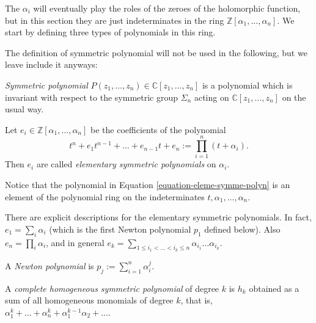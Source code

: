 \medskip\noindent
The $\alpha_i$ will eventually play the roles
of the zeroes
of the holomorphic function, but in this
section they are just
indeterminates in the ring
$\mathbb{Z}[\alpha_1,\ldots,\alpha_n]$.
We start by defining three types of
polynomials in this ring.

The definition of symmetric polynomial
will not be used in the following,
but we leave include it anyways:

\begin{definition}
\label{definition-symmetric-polynomial}
{\it Symmetric polynomial} 
$P(z_1,…,z_n) \in \mathbb{C}[z_1,…,z_n]$
is a polynomial which is invariant
with respect to the symmetric group
$\Sigma_n$ acting on $\mathbb{C}[z_1,…,z_n]$
on the usual way.
\end{definition}

\begin{definition}
\label{definition-elemen-symmetric-poly}
Let $e_i \in
\mathbb{Z}[\alpha_1,\ldots,\alpha_n]$ be the
coefficients of the
polynomial
\begin{equation}
\label{equation-eleme-symme-polyn}
t^n+e_1t^{n-1}+\ldots+e_{n-1}t+e_n:=\prod_{i=
1}^n(t+\alpha_i).
\end{equation}
Then $e_i$ are called {\it elementary
symmetric polynomials} on $\alpha_i$.
\end{definition}

\noindent
Notice that the polynomial in Equation
\ref{equation-eleme-symme-polyn} is an
element of
the polynomial ring
on the indeterminates
$t,\alpha_1,\ldots,\alpha_n$.

There are explicit descriptions
for the elementary symmetric polynomials.
In fact, $e_1=\sum_i\alpha_i$
(which is the first Newton polynomial $p_1$
defined below).
Also $e_n=\prod_{i}\alpha_i$, and in general
$e_k=\sum_{1\leq i_1<\ldots<i_k\leq
n}\alpha_{i_1}\ldots\alpha_{i_k}$.

\begin{definition}
\label{definition-newton-polynomial}
A {\it Newton polynomial} is
$p_j:=\sum_{i=1}^n\alpha_i^j$.
\end{definition}

\begin{definition}
\label{definition-compl-homog-symme-polyn}
A {\it complete homogeneous symmetric
polynomial} of degree $k$ is $h_k$
obtained as a sum of all homogeneous
monomials of degree $k$, that is,
$\alpha_1^k+\ldots+\alpha_n^k+\alpha_1^{k-1}
\alpha_2+\ldots$.
\end{definition}


